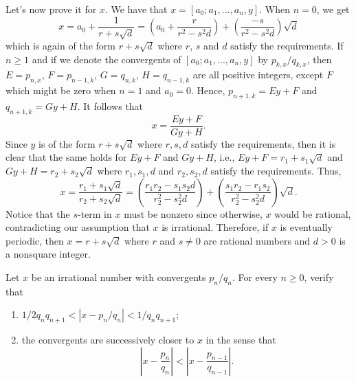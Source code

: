 \begin{solution}
    Let's now prove it for $x$. We have that $x = [a_0; a_1, ..., a_n, y]$. When $n = 0$, we get
    $$x = a_0 + \frac{1}{r + s\sqrt{d}} = \left(a_0 + \frac{r}{r^2 - s^2d}\right) + \left(\frac{-s}{r^2 - s^2d}\right)\sqrt{d}$$
    which is again of the form $r + s\sqrt{d}$ where $r$, $s$ and $d$ satisfy the requirements. If $n \geq 1$ and if we denote the convergents of $[a_0; a_1, ..., a_n, y]$ by $p_{k, x}/q_{k,x}$, then $E = p_{n, x}$, $F = p_{n-1,k}$, $G = q_{n,k}$, $H = q_{n-1,k}$ are all positive integers, except $F$ which might be zero when $n = 1$ and $a_0 = 0$. Hence, $p_{n+1,k} = Ey + F$ and $q_{n+1,k} = Gy + H$. It follows that
    $$x = \frac{Ey + F}{Gy + H}.$$
    Since $y$ is of the form $r + s\sqrt{d}$ where $r,s,d$ satisfy the requirements, then it is clear that the same holds for $Ey + F$ and $Gy + H$, i.e., $Ey + F = r_1 + s_1\sqrt{d}$ and $Gy + H = r_2 + s_2 \sqrt{d}$ where $r_1, s_1, d$ and $r_2, s_2, d$ satisfy the requirements. Thus,
    $$x = \frac{r_1 + s_1\sqrt{d}}{r_2 + s_2\sqrt{d}} = \left(\frac{r_1r_2 - s_1s_2d}{r_2^2 - s_2^2d}\right) + \left(\frac{s_1r_2 - r_1s_2}{r_2^2 - s_2^2d}\right)\sqrt{d}.$$
    Notice that the $s$-term in $x$ must be nonzero since otherwise, $x$ would be rational, contradicting our assumption that $x$ is irrational. Therefore, if $x$ is eventually periodic, then $x = r + s\sqrt{d}$ where $r$ and $s\neq 0$ are rational numbers and $d > 0$ is a nonsquare integer. \\
\end{solution}

\begin{exercise}
    Let $x$ be an irrational number with convergents $p_n/q_n$. For every $n \geq 0$, verify that
    \begin{enumerate}
        \item $1/2q_nq_{n+1} < |x - p_n/q_n| < 1/q_nq_{n+1}$;
        \item the convergents are successively closer to $x$ in the sense that
        $$\left|x - \frac{p_n}{q_n}\right| < \left|x - \frac{p_{n-1}}{q_{n-1}}\right|.$$
         \\
    \end{enumerate}
\end{exercise}

